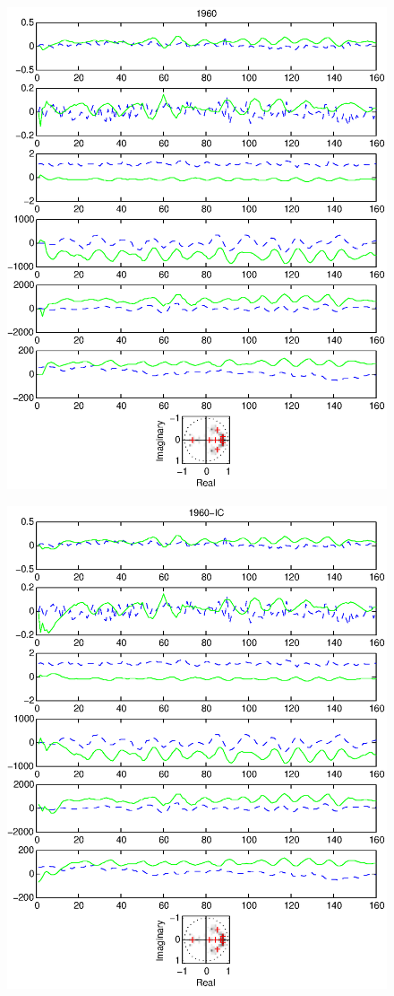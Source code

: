 \documentclass{article}
\begin{document}
\begin{figure}[htb!]\centering
\includegraphics{1960.eps}
\end{figure}\clearpage
\begin{figure}[htb!]\centering
\includegraphics{1960_ic.eps}
\end{figure}\clearpage
\end{document}
